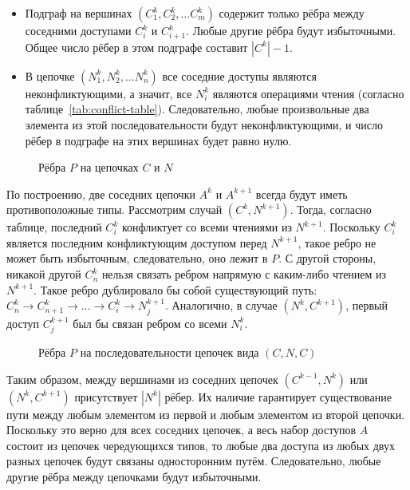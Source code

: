 \begin{itemize}
    \item Подграф на вершинах $(C^k_1, C^k_2, \dots C^k_m)$ содержит только рёбра между соседними доступами $C^k_i$ и $C^k_{i+1}$. Любые другие рёбра будут избыточными. Общее число рёбер в этом подграфе составит $|C^k| - 1$.
    \item В цепочке $(N^k_1, N^k_2, \dots N^k_n)$ все соседние доступы являются неконфликтующими, а значит, все $N^k_i$ являются операциями чтения (согласно таблице~\ref{tab:conflict-table}). Следовательно, любые произвольные два элемента из этой последовательности будут неконфликтующими, и число рёбер в подграфе на этих вершинах будет равно нулю.
\end{itemize}

\begin{figure}[H]
    \centering
    
    \caption{Рёбра $P$ на цепочках $C$ и $N$}
    \label{fig:cn-chains}
\end{figure}

По построению, две соседних цепочки $A^k$ и $A^{k+1}$ всегда будут иметь противоположные типы. Рассмотрим случай $(C^k, N^{k+1})$. Тогда, согласно таблице, последний $C^k_i$ конфликтует со всеми чтениями из $N^{k+1}$. Поскольку $C^k_i$ является последним конфликтующим доступом перед $N^{k+1}$, такое ребро не может быть избыточным, следовательно, оно лежит в $P$. С другой стороны, никакой другой $C^k_n$ нельзя связать ребром напрямую с каким-либо чтением из $N^{k+1}$. Такое ребро дублировало бы собой существующий путь: $C^k_n \rightarrow C^k_{n+1} \rightarrow \ldots \rightarrow C^k_i \rightarrow N^{k+1}_j$. Аналогично, в случае $(N^k, C^{k+1})$, первый доступ $C^{k+1}_j$ был бы связан ребром со всеми $N^k_i$.

\begin{figure}[H]
    \centering
    
    \caption{Рёбра $P$ на последовательности цепочек вида $(C, N, C)$}
    \label{fig:cnc-edges}
\end{figure}

Таким образом, между вершинами из соседних цепочек $(C^{k-1}, N^k)$ или $(N^k, C^{k+1})$ присутствует $|N^k|$ рёбер. Их наличие гарантирует существование пути между любым элементом из первой и любым элементом из второй цепочки. Поскольку это верно для всех соседних цепочек, а весь набор доступов $A$ состоит из цепочек чередующихся типов, то любые два доступа из любых двух разных цепочек будут связаны односторонним путём. Следовательно, любые другие рёбра между цепочками будут избыточными.

